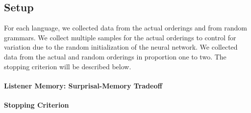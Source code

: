 \documentclass[11pt,letterpaper]{article}
\begin{document}

\subsection{Setup}

For each language, we collected data from the actual orderings and from random grammars.
We collect multiple samples for the actual orderings to control for variation due to the random initialization of the neural network.
We collected data from the actual and random orderings in proportion one to two.
The stopping criterion will be described below.



\paragraph{Listener Memory: Surprisal-Memory Tradeoff}



\paragraph{Stopping Criterion}


%



%
%
\end{document}
